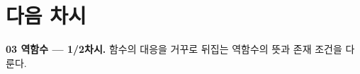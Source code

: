 \documentclass[11pt,a4paper]{article}
\begin{document}
\section{다음 차시}
\begin{calloutbox}
\textbf{03 역함수 --- 1/2차시.} 함수의 대응을 거꾸로 뒤집는 역함수의 뜻과 존재 조건을 다룬다.
\end{calloutbox}
\end{document}
